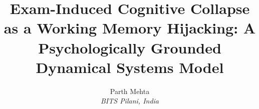 
\documentclass[10pt,twocolumn,a4paper]{article}
\usepackage[a4paper,top=19mm,bottom=43mm,
            left=14.3mm,right=14.3mm,columnsep=4.2mm]{geometry}
\usepackage{times}
\usepackage{titlesec}
\titleformat{\section}
  {\normalfont\normalsize\bfseries\scshape\centering}{\Roman{section}.}{0.5em}{}
\titlespacing{\section}{0pt}{8pt}{4pt}
\titleformat{\subsection}
  {\normalfont\normalsize\itshape}{\Alph{subsection}.}{0.5em}{}
\titlespacing{\subsection}{0pt}{6pt}{2pt}
\setlength{\parindent}{3.5mm}
\setlength{\parskip}{0pt}
\raggedbottom

\usepackage{amsmath}
\usepackage{amssymb}
\usepackage{mathtools}
\usepackage{graphicx}
\usepackage{float}
\usepackage{hyperref}
\usepackage{booktabs}
\usepackage{array}
\usepackage{cite}

\hypersetup{colorlinks=true,linkcolor=black,citecolor=black,urlcolor=black}

\title{\vspace{-1em}\textbf{Exam-Induced Cognitive Collapse as a
Working Memory Hijacking: A Psychologically Grounded
Dynamical Systems Model}}
\author{Parth Mehta\\[2pt]
  \small\textit{BITS Pilani, India}}
\date{}

